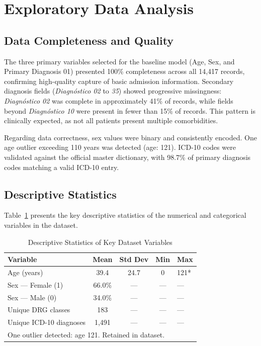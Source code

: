 \documentclass{IEEEtran}
\begin{document}
\section{Exploratory Data Analysis}

\subsection{Data Completeness and Quality}
The three primary variables selected for the baseline model (Age, Sex, and Primary Diagnosis 01) presented 100\% completeness across all 14,417 records, confirming high-quality capture of basic admission information. Secondary diagnosis fields (\textit{Diagn\'ostico 02} to \textit{35}) showed progressive missingness: \textit{Diagn\'ostico 02} was complete in approximately 41\% of records, while fields beyond \textit{Diagn\'ostico 10} were present in fewer than 15\% of records. This pattern is clinically expected, as not all patients present multiple comorbidities.

Regarding data correctness, sex values were binary and consistently encoded. One age outlier exceeding 110 years was detected (age: 121). ICD-10 codes were validated against the official master dictionary, with 98.7\% of primary diagnosis codes matching a valid ICD-10 entry.

\subsection{Descriptive Statistics}
Table~\ref{tab:stats} presents the key descriptive statistics of the numerical and categorical variables in the dataset.

\begin{table}[htbp]
\caption{Descriptive Statistics of Key Dataset Variables}
\label{tab:stats}
\centering
\begin{tabular}{p{2.1cm}cccp{1.8cm}}
\toprule
\textbf{Variable} & \textbf{Mean} & \textbf{Std Dev} & \textbf{Min} & \textbf{Max} \\
\midrule
Age (years)               & 39.4  & 24.7 & 0   & 121* \\
Sex --- Female (1)        & 66.0\% & ---  & --- & ---  \\
Sex --- Male (0)          & 34.0\% & ---  & --- & ---  \\
Unique DRG classes        & 183   & ---  & --- & ---  \\
Unique ICD-10 diagnoses   & 1,491 & ---  & --- & ---  \\
\bottomrule
\multicolumn{5}{l}{\footnotesize *One outlier detected: age 121. Retained in dataset.}
\end{tabular}
\end{table}
\end{document}
